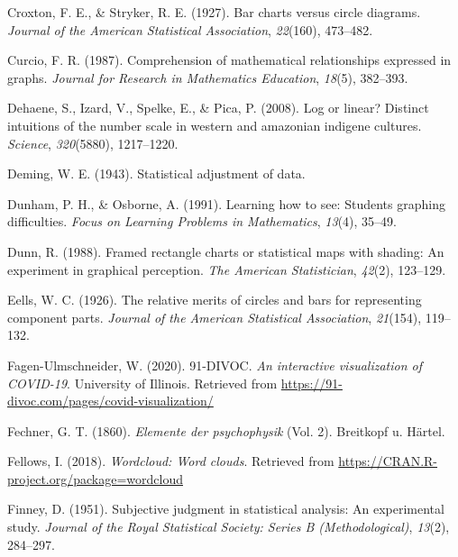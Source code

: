 \documentclass[print]{nuthesis}
\newlength{\cslhangindent}
\newenvironment{CSLReferences}%
{\setlength{\parindent}{0pt}%
\everypar{\setlength{\hangindent}{\cslhangindent}}\ignorespaces}%
{\par}
\begin{document}
\begin{CSLReferences}{1}{0}
\leavevmode{}%
Croxton, F. E., \& Stryker, R. E. (1927). Bar charts versus circle diagrams. \emph{Journal of the American Statistical Association}, \emph{22}(160), 473--482.

\leavevmode{}%
Curcio, F. R. (1987). Comprehension of mathematical relationships expressed in graphs. \emph{Journal for Research in Mathematics Education}, \emph{18}(5), 382--393.

\leavevmode{}%
Dehaene, S., Izard, V., Spelke, E., \& Pica, P. (2008). Log or linear? Distinct intuitions of the number scale in western and amazonian indigene cultures. \emph{Science}, \emph{320}(5880), 1217--1220.

\leavevmode{}%
Deming, W. E. (1943). Statistical adjustment of data.

\leavevmode{}%
Dunham, P. H., \& Osborne, A. (1991). Learning how to see: Students graphing difficulties. \emph{Focus on Learning Problems in Mathematics}, \emph{13}(4), 35--49.

\leavevmode{}%
Dunn, R. (1988). Framed rectangle charts or statistical maps with shading: An experiment in graphical perception. \emph{The American Statistician}, \emph{42}(2), 123--129.

\leavevmode{}%
Eells, W. C. (1926). The relative merits of circles and bars for representing component parts. \emph{Journal of the American Statistical Association}, \emph{21}(154), 119--132.

\leavevmode{}%
Fagen-Ulmschneider, W. (2020). 91-DIVOC. \emph{An interactive visualization of COVID-19}. University of Illinois. Retrieved from \url{https://91-divoc.com/pages/covid-visualization/}

\leavevmode{}%
Fechner, G. T. (1860). \emph{Elemente der psychophysik} (Vol. 2). Breitkopf u. H{ä}rtel.

\leavevmode{}%
Fellows, I. (2018). \emph{Wordcloud: Word clouds}. Retrieved from \url{https://CRAN.R-project.org/package=wordcloud}

\leavevmode{}%
Finney, D. (1951). Subjective judgment in statistical analysis: An experimental study. \emph{Journal of the Royal Statistical Society: Series B (Methodological)}, \emph{13}(2), 284--297.


\end{CSLReferences}
\end{document}
